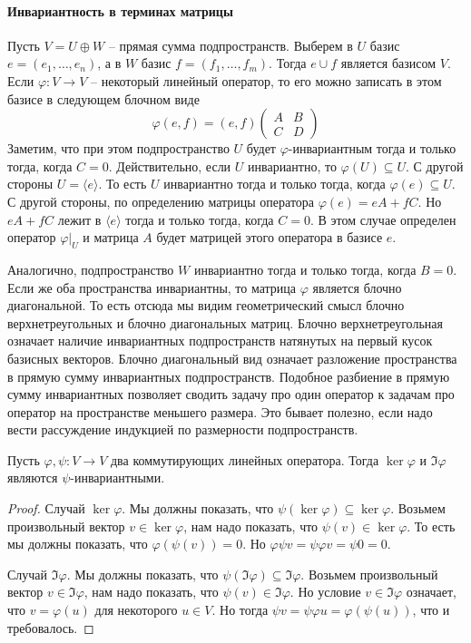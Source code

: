 \paragraph{Инвариантность в терминах матрицы}

Пусть $V = U \oplus W$ -- прямая сумма подпространств.
Выберем в $U$ базис $e=(e_1,\ldots,e_n)$, а в $W$ базис $f = (f_1,\ldots,f_m)$.
Тогда $e \cup f$ является базисом $V$.
Если $\varphi \colon V \to V$ -- некоторый линейный оператор, то его можно записать в этом базисе в следующем блочном виде
\[
\varphi (e, f) = (e, f)
\begin{pmatrix}
{A}&{B}\\
{C}&{D}
\end{pmatrix}
\]
Заметим, что при этом подпространство $U$ будет $\varphi$-инвариантным тогда и только тогда, когда $C = 0$.
Действительно, если $U$ инвариантно, то $\varphi(U)\subseteq U$.
С другой стороны $U = \langle e \rangle$.
То есть $U$ инвариантно тогда и только тогда, когда $\varphi(e) \subseteq U$.
С другой стороны, по определению матрицы оператора $\varphi (e) = eA + fC$.
Но $eA + fC$ лежит в $\langle e\rangle$ тогда и только тогда, когда $C = 0$.
В этом случае определен оператор $\varphi|_U$ и матрица $A$ будет матрицей этого оператора в базисе $e$.

Аналогично, подпространство $W$ инвариантно тогда и только тогда, когда $B = 0$.
Если же оба пространства инвариантны, то матрица $\varphi$ является блочно диагональной.
То есть отсюда мы видим геометрический смысл блочно верхнетреугольных и блочно диагональных матриц.
Блочно верхнетреугольная означает наличие инвариантных подпространств натянутых на первый кусок базисных векторов.
Блочно диагональный вид означает разложение пространства в прямую сумму инвариантных подпространств.
Подобное разбиение в прямую сумму инвариантных позволяет сводить задачу про один оператор к задачам про оператор на пространстве меньшего размера.
Это бывает полезно, если надо вести рассуждение индукцией по размерности подпространств.

\begin{claim}
\label{claim::KerImInvar}
Пусть $\varphi,\psi\colon V\to V$ два коммутирующих линейных оператора.
Тогда $\ker \varphi$ и $\Im\varphi$ являются $\psi$-инвариантными.
\end{claim}
\begin{proof}
Случай $\ker \varphi$.
Мы должны показать, что $\psi(\ker\varphi) \subseteq \ker \varphi$.
Возьмем произвольный вектор $v\in \ker\varphi$, нам надо показать, что $\psi(v) \in \ker \varphi$.
То есть мы должны показать, что $\varphi(\psi(v)) = 0$.
Но $\varphi \psi v = \psi \varphi v = \psi 0 = 0$.

Случай $\Im \varphi$.
Мы должны показать, что $\psi(\Im \varphi) \subseteq \Im \varphi$.
Возьмем произвольный вектор $v\in \Im\varphi$, нам надо показать, что $\psi(v) \in \Im\varphi$.
Но условие $v\in \Im \varphi$ означает, что $v = \varphi (u)$ для некоторого $u\in V$.
Но тогда $\psi v = \psi \varphi u = \varphi (\psi(u))$, что и требовалось.
\end{proof}


